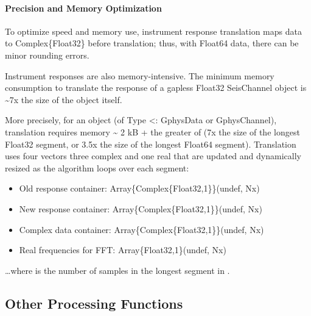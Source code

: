 \documentclass[letterpaper,11pt,english]{sphinxmanual}
\begin{document}
\paragraph{Precision and Memory Optimization}
\label{\detokenize{src/Processing/processing:precision-and-memory-optimization}}
To optimize speed and memory use, instrument response translation maps data to
Complex\{Float32\} before translation; thus, with Float64 data, there can be
minor rounding errors.

Instrument responses are also memory-intensive. The minimum memory consumption
to translate the response of a gapless Float32 SeisChannel object is \textasciitilde{}7x the
size of the object itself.

More precisely, for an object  (of Type \textless{}: GphysData or GphysChannel),
translation requires memory \textasciitilde{} 2 kB + the greater of (7x the size of the longest
Float32 segment, or 3.5x the size of the longest Float64 segment). Translation
uses four vectors \textendash{} three complex and one real \textendash{} that are updated and
dynamically resized as the algorithm loops over each segment:
\begin{itemize}
\item {} 
Old response container: Array\{Complex\{Float32,1\}\}(undef, Nx)

\item {} 
New response container: Array\{Complex\{Float32,1\}\}(undef, Nx)

\item {} 
Complex data container: Array\{Complex\{Float32,1\}\}(undef, Nx)

\item {} 
Real frequencies for FFT: Array\{Float32,1\}(undef, Nx)

\end{itemize}

…where  is the number of samples in the longest segment in .


\subsection{Other Processing Functions}
\label{\detokenize{src/Processing/processing:other-processing-functions}}

\begin{fulllineitems}
\end{fulllineitems}
\end{document}
